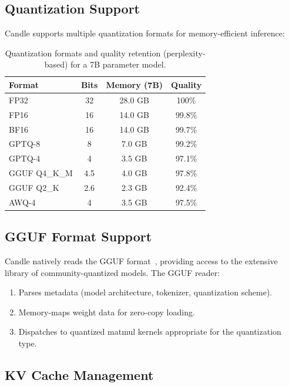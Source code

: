 \documentclass[11pt,twocolumn]{article}
\begin{document}
\subsection{Quantization Support}

Candle supports multiple quantization formats for memory-efficient inference:

\begin{table}[H]
\centering
\small
\begin{tabular}{lccc}
\toprule
\textbf{Format} & \textbf{Bits} & \textbf{Memory (7B)} & \textbf{Quality} \\
\midrule
FP32 & 32 & 28.0 GB & 100\% \\
FP16 & 16 & 14.0 GB & 99.8\% \\
BF16 & 16 & 14.0 GB & 99.7\% \\
GPTQ-8 & 8 & 7.0 GB & 99.2\% \\
GPTQ-4 & 4 & 3.5 GB & 97.1\% \\
GGUF Q4\_K\_M & 4.5 & 4.0 GB & 97.8\% \\
GGUF Q2\_K & 2.6 & 2.3 GB & 92.4\% \\
AWQ-4 & 4 & 3.5 GB & 97.5\% \\
\bottomrule
\end{tabular}
\caption{Quantization formats and quality retention (perplexity-based) for a 7B parameter model.}
\label{tab:quantization}
\end{table}

\subsection{GGUF Format Support}

Candle natively reads the GGUF format~\cite{ggml2023}, providing access to the extensive library of community-quantized models. The GGUF reader:

\begin{enumerate}[leftmargin=1.4em]
    \item Parses metadata (model architecture, tokenizer, quantization scheme).
    \item Memory-maps weight data for zero-copy loading.
    \item Dispatches to quantized matmul kernels appropriate for the quantization type.
\end{enumerate}

\subsection{KV Cache Management}
\end{document}
